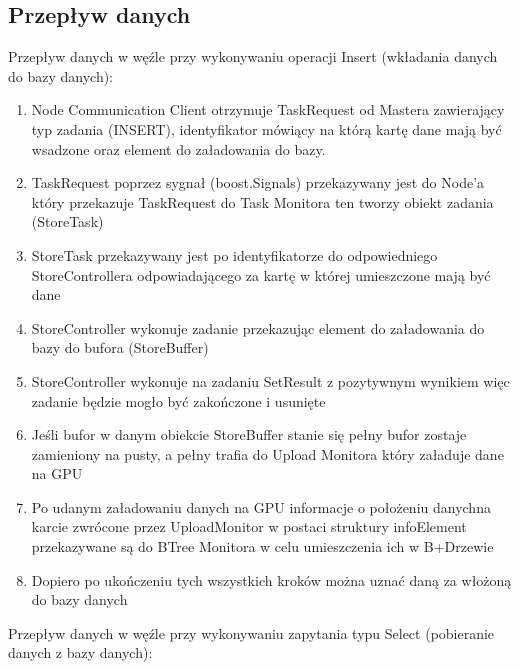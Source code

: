 \documentclass[paper=a4, fontsize=11pt]{scrartcl} %
\numberwithin{equation}{section} %
\numberwithin{figure}{section} %
\numberwithin{table}{section} %
\begin{document}
	\subsection{Przepływ danych}
		Przepływ danych w węźle przy wykonywaniu operacji Insert (wkładania danych do bazy danych):
		\begin{enumerate}
			\item Node Communication Client otrzymuje TaskRequest od Mastera zawierający typ zadania (INSERT), identyfikator mówiący 
				na którą kartę dane mają być wsadzone oraz element do załadowania do bazy.
			\item TaskRequest poprzez sygnał (boost.Signals) przekazywany jest do Node'a który przekazuje TaskRequest do Task Monitora ten tworzy 
				obiekt zadania (StoreTask)
			\item StoreTask przekazywany jest po identyfikatorze do odpowiedniego StoreControllera odpowiadającego za kartę w której umieszczone mają być dane
			\item StoreController wykonuje zadanie przekazując element do załadowania do bazy do bufora (StoreBuffer)
			\item StoreController wykonuje na zadaniu SetResult z pozytywnym wynikiem więc zadanie będzie mogło być zakończone i usunięte
			\item Jeśli bufor w danym obiekcie StoreBuffer  stanie się pełny bufor zostaje zamieniony na pusty, a pełny trafia do Upload Monitora który załaduje dane na GPU
			\item Po udanym załadowaniu danych na GPU informacje o położeniu danychna karcie zwrócone przez UploadMonitor w postaci struktury infoElement przekazywane są do
				BTree Monitora w celu umieszczenia ich w B+Drzewie 
			\item Dopiero po ukończeniu tych wszystkich kroków można uznać daną za włożoną do bazy danych
		\end{enumerate}
		Przepływ danych w węźle przy wykonywaniu zapytania typu Select (pobieranie danych z bazy danych):
\end{document}
